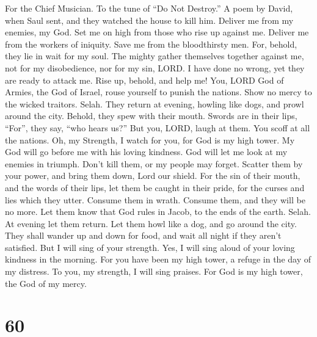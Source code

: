 For the Chief Musician. To the tune of ``Do Not Destroy.'' A poem by
David, when Saul sent, and they watched the house to kill him.
 Deliver me from my enemies, my God. Set me on high from
those who rise up against me.  Deliver me from the workers
of iniquity. Save me from the bloodthirsty men.  For,
behold, they lie in wait for my soul. The mighty gather themselves
together against me, not for my disobedience, nor for my sin, LORD.
 I have done no wrong, yet they are ready to attack me. Rise
up, behold, and help me!  You, LORD God of Armies, the God
of Israel, rouse yourself to punish the nations. Show no mercy to the
wicked traitors. Selah.  They return at evening, howling
like dogs, and prowl around the city.  Behold, they spew
with their mouth. Swords are in their lips, ``For'', they say, ``who
hears us?''  But you, LORD, laugh at them. You scoff at all
the nations.  Oh, my Strength, I watch for you, for God is
my high tower.  My God will go before me with his loving
kindness. God will let me look at my enemies in triumph. 
Don't kill them, or my people may forget. Scatter them by your power,
and bring them down, Lord our shield.  For the sin of their
mouth, and the words of their lips, let them be caught in their pride,
for the curses and lies which they utter.  Consume them in
wrath. Consume them, and they will be no more. Let them know that God
rules in Jacob, to the ends of the earth. Selah.  At
evening let them return. Let them howl like a dog, and go around the
city.  They shall wander up and down for food, and wait all
night if they aren't satisfied.  But I will sing of your
strength. Yes, I will sing aloud of your loving kindness in the morning.
For you have been my high tower, a refuge in the day of my distress.
 To you, my strength, I will sing praises. For God is my
high tower, the God of my mercy.

\hypertarget{section-59}{%
\section{60}\label{section-59}}

